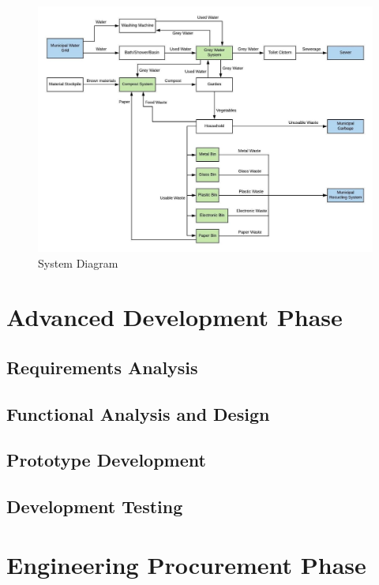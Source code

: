 \documentclass[a4paper,11pt,fleqn]{report}
\begin{document}
\begin{figure}[h!]
\begin{center}
\includegraphics[scale = 0.34]{System_Diagram.jpg}
\caption{System Diagram}
\label{fig: systemDiagram}
\end{center}
\end{figure}


\section{Advanced Development Phase}

\subsection{Requirements Analysis}

\subsection{Functional Analysis and Design}

\subsection{Prototype Development}

\subsection{Development Testing}

\section{Engineering Procurement Phase}
\end{document}

